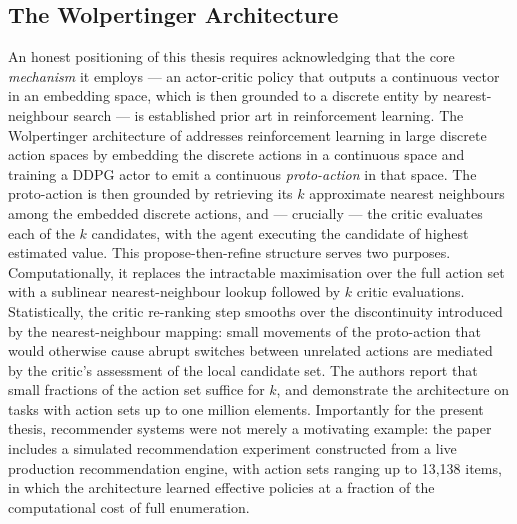 \subsection{The Wolpertinger Architecture}

An honest positioning of this thesis requires acknowledging that the core \textit{mechanism} it employs — an actor-critic policy that outputs a continuous vector in an embedding space, which is then grounded to a discrete entity by nearest-neighbour search — is established prior art in reinforcement learning. The Wolpertinger architecture of \citet{dulacarnold2015deep} addresses reinforcement learning in large discrete action spaces by embedding the discrete actions in a continuous space and training a DDPG actor to emit a continuous \textit{proto-action} in that space. The proto-action is then grounded by retrieving its $k$ approximate nearest neighbours among the embedded discrete actions, and — crucially — the critic evaluates each of the $k$ candidates, with the agent executing the candidate of highest estimated value. This propose-then-refine structure serves two purposes. Computationally, it replaces the intractable maximisation over the full action set with a sublinear nearest-neighbour lookup followed by $k$ critic evaluations. Statistically, the critic re-ranking step smooths over the discontinuity introduced by the nearest-neighbour mapping: small movements of the proto-action that would otherwise cause abrupt switches between unrelated actions are mediated by the critic's assessment of the local candidate set. The authors report that small fractions of the action set suffice for $k$, and demonstrate the architecture on tasks with action sets up to one million elements. Importantly for the present thesis, recommender systems were not merely a motivating example: the paper includes a simulated recommendation experiment constructed from a live production recommendation engine, with action sets ranging up to 13{,}138 items, in which the architecture learned effective policies at a fraction of the computational cost of full enumeration.

